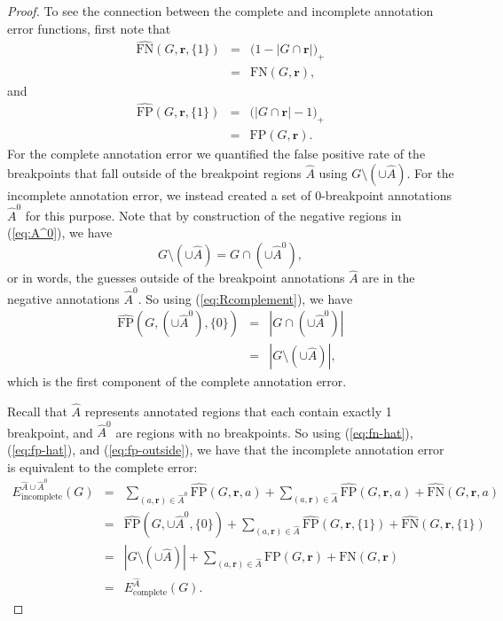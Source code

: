 \documentclass{article}
\renewcommand{\r}{ \mathbf{ r} }
\begin{document}
\begin{proof}

To see the connection between the complete and incomplete annotation
error functions, first note that
\begin{eqnarray}
\nonumber  \hat{\text{FN}}(G,\r,\{1\}) 
&=&   \big(
1-|G\cap\r|
\big)_+\\
&=&
\text{FN}(G,\r), \label{eq:fn-hat}
\end{eqnarray}
and
\begin{eqnarray}
\nonumber
  \hat{\text{FP}}(G,\r,\{1\}) 
&=&
\big( 
|G\cap\r|-1
\big)_+\\
&=& \text{FP}(G,\r). \label{eq:fp-hat}
\end{eqnarray}
For the complete annotation error we quantified the false positive
rate of the breakpoints that fall outside of the breakpoint regions
$\hat A$ using $G\setminus(\cup \hat A)$. For the incomplete
annotation error, we instead created a set of 0-breakpoint annotations
$\hat A^0$ for this purpose. Note that by construction of the negative
regions in (\ref{eq:A^0}), we have 
\begin{equation}
  \label{eq:Rcomplement}
  G\setminus \left(\cup \hat A\right)
 = 
G\cap\left(\cup \hat A^0 \right),
\end{equation}
or in words, the guesses outside of the breakpoint annotations $\hat A$
are in the negative annotations $\hat A^0$. So using
(\ref{eq:Rcomplement}), we have
\begin{eqnarray}
  \hat{\text{FP}}(G,(\cup \hat A^0),\{0\})
&=& 
|G\cap(
  \cup \hat A^0
)|\nonumber
\\
&=&
|G\setminus(\cup\hat A)|,\label{eq:fp-outside}
\end{eqnarray}
which is the first component of the complete annotation error.

Recall that $\hat A$ represents annotated regions that each contain
exactly 1 breakpoint, and $\hat A^0$ are regions with no breakpoints. So
using (\ref{eq:fn-hat}), (\ref{eq:fp-hat}), and
(\ref{eq:fp-outside}), we have that the incomplete annotation error
is equivalent to the complete error:
\begin{eqnarray}
  E_{\text{incomplete}}^{\hat A\cup \hat A^0}(G)
&=&
\sum_{(a, \r)\in \hat A^0} \hat{\text{FP}}(G,\r,a)\nonumber 
+
\sum_{(a, \r)\in\hat A} \hat{\text{FP}}(G,\r,a) + \hat{\text{FN}}(G,\r,a)
 \\
&=&
 \hat{\text{FP}}(G,\cup \hat A^0,\{0\})\nonumber 
+
\sum_{(a, \r)\in\hat A} \hat{\text{FP}}(G,\r,\{1\}) + \hat{\text{FN}}(G,\r,\{1\})
 \\
&=&
|G\setminus(\cup\hat A)|
+\nonumber
\sum_{(a, \r)\in\hat A} {\text{FP}}(G,\r) + {\text{FN}}(G,\r)\\
&=&
E^{\hat A}_{\text{complete}}(G).
\end{eqnarray}

\end{proof}
\end{document}
